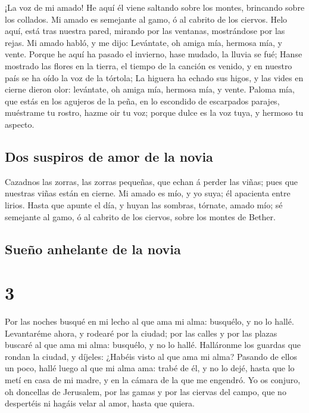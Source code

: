  ¡La voz de mi amado! He aquí él viene saltando sobre los
montes, brincando sobre los collados.  Mi amado es
semejante al gamo, ó al cabrito de los ciervos. Helo aquí, está tras
nuestra pared, mirando por las ventanas, mostrándose por las rejas.
 Mi amado habló, y me dijo: Levántate, oh amiga mía,
hermosa mía, y vente.  Porque he aquí ha pasado el
invierno, hase mudado, la lluvia se fué;  Hanse mostrado
las flores en la tierra, el tiempo de la canción es venido, y en nuestro
país se ha oído la voz de la tórtola;  La higuera ha
echado sus higos, y las vides en cierne dieron olor: levántate, oh amiga
mía, hermosa mía, y vente.  Paloma mía, que estás en los
agujeros de la peña, en lo escondido de escarpados parajes, muéstrame tu
rostro, hazme oir tu voz; porque dulce es la voz tuya, y hermoso tu
aspecto.

\hypertarget{dos-suspiros-de-amor-de-la-novia}{%
\subsection{Dos suspiros de amor de la
novia}\label{dos-suspiros-de-amor-de-la-novia}}

 Cazadnos las zorras, las zorras pequeñas, que echan á
perder las viñas; pues que nuestras viñas están en cierne.
 Mi amado es mío, y yo suya; él apacienta entre lirios.
 Hasta que apunte el día, y huyan las sombras, tórnate,
amado mío; sé semejante al gamo, ó al cabrito de los ciervos, sobre los
montes de Bether.

\hypertarget{sueuxf1o-anhelante-de-la-novia}{%
\subsection{Sueño anhelante de la
novia}\label{sueuxf1o-anhelante-de-la-novia}}

\hypertarget{section-2}{%
\section{3}\label{section-2}}

 Por las noches busqué en mi lecho al que ama mi alma:
busquélo, y no lo hallé.  Levantaréme ahora, y rodearé por
la ciudad; por las calles y por las plazas buscaré al que ama mi alma:
busquélo, y no lo hallé.  Halláronme los guardas que
rondan la ciudad, y díjeles: ¿Habéis visto al que ama mi alma?
 Pasando de ellos un poco, hallé luego al que mi alma ama:
trabé de él, y no lo dejé, hasta que lo metí en casa de mi madre, y en
la cámara de la que me engendró.  Yo os conjuro, oh
doncellas de Jerusalem, por las gamas y por las ciervas del campo, que
no despertéis ni hagáis velar al amor, hasta que quiera.


